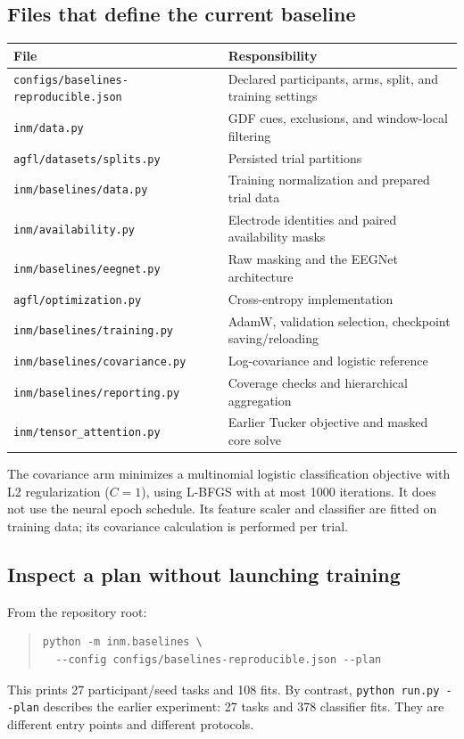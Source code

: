 \documentclass[11pt,a4paper]{article}
\newcommand{\code}[1]{{\small\nolinkurl{#1}}}
\begin{document}
\subsection*{Files that define the current baseline}
\begin{tabularx}{\linewidth}{@{}L{73mm}Y@{}}
\toprule
File & Responsibility \\
\midrule
\code{configs/baselines-reproducible.json} & Declared participants, arms, split, and training settings \\
\code{inm/data.py} & GDF cues, exclusions, and window-local filtering \\
\code{agfl/datasets/splits.py} & Persisted trial partitions \\
\code{inm/baselines/data.py} & Training normalization and prepared trial data \\
\code{inm/availability.py} & Electrode identities and paired availability masks \\
\code{inm/baselines/eegnet.py} & Raw masking and the EEGNet architecture \\
\code{agfl/optimization.py} & Cross-entropy implementation \\
\code{inm/baselines/training.py} & AdamW, validation selection, checkpoint saving/reloading \\
\code{inm/baselines/covariance.py} & Log-covariance and logistic reference \\
\code{inm/baselines/reporting.py} & Coverage checks and hierarchical aggregation \\
\code{inm/tensor_attention.py} & Earlier Tucker objective and masked core solve \\
\bottomrule
\end{tabularx}

The covariance arm minimizes a multinomial logistic classification objective
with L2 regularization ($C=1$), using L-BFGS with at most 1000 iterations. It
does not use the neural epoch schedule. Its feature scaler and classifier are
fitted on training data; its covariance calculation is performed per trial.

\subsection*{Inspect a plan without launching training}
From the repository root:
\begin{quote}\small
\begin{verbatim}
python -m inm.baselines \
  --config configs/baselines-reproducible.json --plan
\end{verbatim}
\end{quote}
This prints 27 participant/seed tasks and 108 fits. By contrast,
\texttt{python run.py -{}-plan} describes the earlier experiment: 27 tasks and
378 classifier fits. They are different entry points and different protocols.
\end{document}
